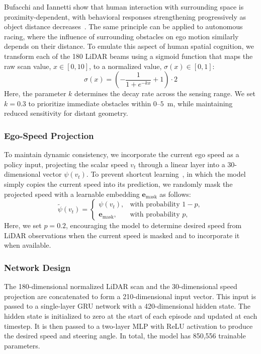 \documentclass[letterpaper,10 pt,conference]{ieeeconf}
\begin{document}
Bufacchi and Iannetti show that human interaction with surrounding space is proximity-dependent, with behavioral responses strengthening progressively as object distance decreases~\cite{bufacchi2018action}.
The same principle can be applied to autonomous racing, where the influence of surrounding obstacles on ego motion similarly depends on their distance.
To emulate this aspect of human spatial cognition, we transform each of the 180 LiDAR beams using a sigmoid function that maps the raw scan value, \(x \in [0, 10]\), to a normalized value, \(\sigma(x) \in [0,1]\):
\begin{equation}
    \sigma(x) = \left(-\frac{1}{1 + e^{-k x}} + 1\right) \cdot 2
\end{equation}
Here, the parameter $k$ determines the decay rate across the sensing range. We set $k=0.3$ to prioritize immediate obstacles within $0\text{--}5$~m, while maintaining reduced sensitivity for distant geometry.


\subsubsection{Ego-Speed Projection}

To maintain dynamic consistency, we incorporate the current ego speed as a policy input, projecting the scalar speed \(v_t\) through a linear layer into a 30-dimensional vector \(\psi(v_t)\).
To prevent shortcut learning~\cite{shortcut}, in which the model simply copies the current speed into its prediction, we randomly mask the projected speed with a learnable embedding $\mathbf{e}_{\mathrm{mask}}$ as follows:
\begin{equation}
\widetilde{\psi}(v_t) =
\begin{cases}
    \psi(v_t), & \text{with probability } 1-p, \\
    \mathbf{e}_{\mathrm{mask}}, & \text{with probability } p,
\end{cases}
\end{equation}
Here, we set \(p=0.2\), encouraging the model to determine desired speed from LiDAR observations when the current speed is masked and to incorporate it when available.

\subsubsection{Network Design}

The 180-dimensional normalized LiDAR scan and the 30-dimensional speed projection are concatenated to form a 210-dimensional input vector.
This input is passed to a single-layer GRU network with a 420-dimensional hidden state.
The hidden state is initialized to zero at the start of each episode and updated at each timestep.
It is then passed to a two-layer MLP with ReLU activation to produce the desired speed and steering angle.
In total, the model has 850,556 trainable parameters.
\end{document}
